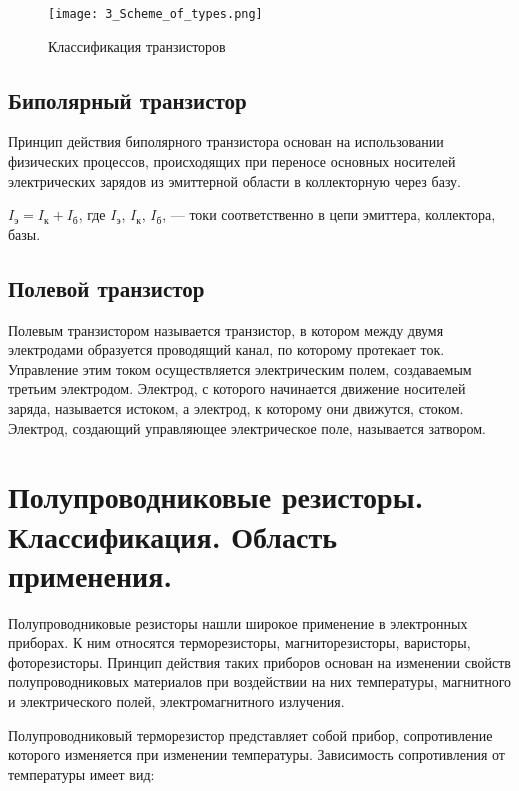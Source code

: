 \begin{figure}[H]
\centering
\texttt{[image: 3\_Scheme\_of\_types.png]}
\caption{Классификация транзисторов}
\label{fig:3_Scheme_of_types}
\end{figure}

\subsection*{Биполярный транзистор}

Принцип действия биполярного транзистора основан на использовании физических процессов, происходящих при переносе основных носителей электрических зарядов из эмиттерной области в коллекторную через базу.

$I_\text{э} = I_\text{к} + I_\text{б}$, где $I_\text{э}$, $I_\text{к}$, $I_\text{б}$, --- токи соответственно в цепи эмиттера, коллектора, базы.

\subsection*{Полевой транзистор}

Полевым транзистором называется транзистор, в котором между двумя электродами образуется проводящий канал, по которому протекает ток. Управление этим током осуществляется электрическим полем, создаваемым третьим электродом. Электрод, с которого начинается движение носителей заряда, называется истоком, а электрод, к которому они движутся, стоком. Электрод, создающий управляющее электрическое поле, называется затвором.


\section{Полупроводниковые резисторы. Классификация. Область применения.}

Полупроводниковые резисторы нашли широкое применение в электронных приборах. К ним относятся терморезисторы, магниторезисторы, варисторы, фоторезисторы. Принцип действия таких приборов основан на изменении свойств полупроводниковых материалов при воздействии на них температуры, магнитного и электрического полей, электромагнитного излучения.

Полупроводниковый терморезистор представляет собой прибор, сопротивление которого изменяется при изменении температуры. Зависимость сопротивления от температуры имеет вид:

